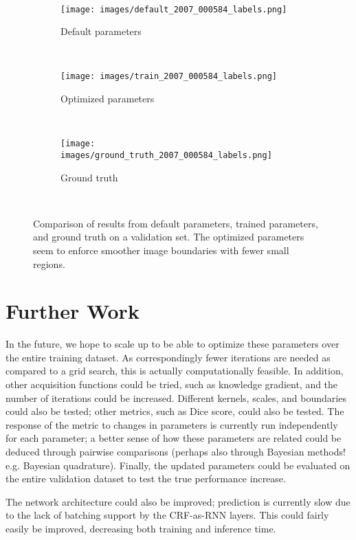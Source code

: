 \documentclass[10pt,twocolumn,letterpaper]{article}
\begin{document}
\begin{figure*}[t!]
\begin{subfigure}[t]{0.3\textwidth}
    \end{subfigure} \\
    \centering
    \begin{subfigure}[t]{0.3\textwidth}
        \centering
        \texttt{[image: images/default\_2007\_000584\_labels.png]}
        \caption{\small{Default parameters}}
    \end{subfigure}
    ~
    \begin{subfigure}[t]{0.3\textwidth}
        \centering
        \texttt{[image: images/train\_2007\_000584\_labels.png]}
        \caption{\small{Optimized parameters}}
    \end{subfigure}
    ~
    \begin{subfigure}[t]{0.3\textwidth}
        \centering
        \texttt{[image: images/ground\_truth\_2007\_000584\_labels.png]}
        \caption{\small{Ground truth}}
    \end{subfigure} \\
\caption{\small{Comparison of results from default parameters, trained parameters, and ground truth on a validation set. The optimized parameters seem to enforce smoother image boundaries 
with fewer small regions.}}
\label{fig:comparison}
\end{figure*}

\section{Further Work}

In the future, we hope to scale up to be able to optimize these parameters over the entire training dataset. As correspondingly fewer iterations are needed as compared to a grid search, this is
actually computationally feasible. In addition, other acquisition functions could be tried, such as knowledge gradient, and the number of iterations could be increased. Different kernels, scales, and 
boundaries could also be tested; other metrics, such as Dice score, could also be tested. The response of the metric to changes in parameters is currently run independently for each parameter; a better sense of how these parameters are related could be deduced through pairwise comparisons (perhaps also through Bayesian methods! e.g. Bayesian quadrature). Finally, the updated parameters could be evaluated on the entire validation dataset to test the true performance increase.

The network architecture could also be improved; prediction is currently slow due to the lack of batching support by the CRF-as-RNN layers. This could fairly easily be improved, decreasing both training and inference time. 
\end{document}
